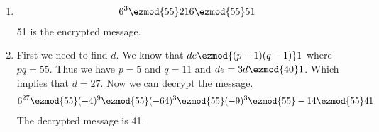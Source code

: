 \begin{enumerate}[label=\ilabel]
    \item
        \begin{gather*}
            6^3 \ezmod{55} 216 \ezmod{55} 51
        \end{gather*}
        51 is the encrypted message.
    
    \item
        First we need to find $d$. We know that $de \ezmod{(p - 1)(q- 1)} 1$ where $pq = 55$. Thus we have $p = 5$ and $q = 11$ and $de = 3d \ezmod{40} 1$. Which implies that $d = 27$. Now we can decrypt the message.
        \begin{gather*}
            6^{27} \ezmod{55} (-4)^9 \ezmod{55} (-64)^3 \ezmod{55} (-9)^3 \ezmod{55} -14 \ezmod{55} 41
        \end{gather*}
        The decrypted message is 41.
\end{enumerate}